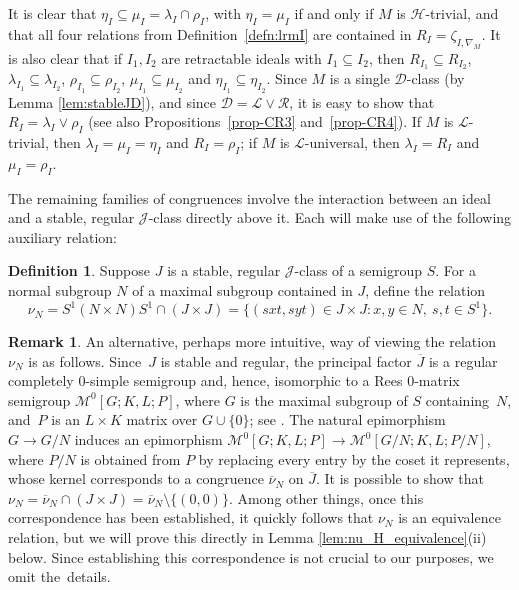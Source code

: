 \documentclass[11pt,a4paper]{article}
\newcommand{\M}{\mathcal M}
\renewcommand{\H}{\mathrel{\mathscr H}}
\renewcommand{\L}{\mathrel{\mathscr L}}
\newcommand{\R}{\mathrel{\mathscr R}}
\newcommand{\D}{\mathrel{\mathscr D}}
\newcommand{\gJ}{\mathrel{\mathscr J}}
\newcommand{\lam}{\lambda}
\newcommand{\set}[2]{\{ {#1} : {#2} \}}
\newcommand{\1}{\id_n}
\newcommand{\sub}{\subseteq}
\numberwithin{equation}{section}
\theoremstyle{definition}
\newtheorem{rem}[equation]{Remark}
\newtheorem{defn}[equation]{Definition}
\begin{document}
It is clear that $\eta_I\sub\mu_I=\lam_I\cap\rho_I$, with $\eta_I=\mu_I$ if and only if $M$ is $\H$-trivial, and that all four relations from Definition~\ref{defn:lrmI} are contained in $R_I=\zeta_{I,\nabla_M}$.  
%
It is also clear that if $I_1,I_2$ are retractable ideals with $I_1\sub I_2$, then $R_{I_1}\sub R_{I_2}$, $\lam_{I_1}\sub \lam_{I_2}$, $\rho_{I_1}\sub \rho_{I_2}$, $\mu_{I_1}\sub \mu_{I_2}$ and $\eta_{I_1}\sub \eta_{I_2}$.  Since $M$ is a single $\D$-class (by Lemma \ref{lem:stableJD}), and since ${\D}={\L}\vee{\R}$, it is easy to show that $R_I=\lam_I\vee\rho_I$ (see also Propositions~\ref{prop-CR3} and~\ref{prop-CR4}).  If $M$ is $\L$-trivial, then $\lam_I=\mu_I=\eta_I$ and $R_I=\rho_I$; if $M$ is $\L$-universal, then $\lam_I=R_I$ and~$\mu_I=\rho_I$.

The remaining families of congruences involve the interaction between an ideal and a stable, regular $\gJ$-class directly above it.  Each will make use of the following auxiliary relation:

\begin{defn}
\label{Rel-nu}
Suppose $J$ is a stable, regular $\gJ$-class of a semigroup $S$.  For a normal subgroup $N$ of a maximal subgroup contained in $J$, define the relation
\[
\nu_N = S^1(N\times N)S^1\cap(J\times J) = \set{ (sxt,syt)\in J\times J}{ x,y\in N,\ s,t\in S^1}.
\]
\end{defn}

\begin{rem}
An alternative, perhaps more intuitive, way of viewing the relation $\nu_N$ is
as follows.  
%
Since~$J$ is stable and regular, the principal factor $\overline{J}$ is a regular
completely $0$-simple semigroup and, hence, isomorphic to a Rees $0$-matrix
semigroup $\M^0[G;K,L; P]$, where $G$ is the maximal subgroup of $S$ containing~$N$, and~$P$ is an $L\times K$ matrix over $G\cup\{0\}$; see \cite[Section 3.2]{Howie}.  The natural
epimorphism $G\rightarrow G/N$ induces an epimorphism ${\M^0[G;K,L;P]\rightarrow
\M^0[G/N;K,L;P/N]}$, where $P/N$ is obtained from $P$ by replacing every entry by
the coset it represents, whose kernel corresponds to a congruence
$\overline{\nu}_N$ on $\overline{J}$.  It is possible to show that
$\nu_N=\overline{\nu}_N\cap(J\times J)=\overline{\nu}_N\setminus\{(0,0)\}$.  
%
Among other things, once this correspondence has been established, it quickly follows that $\nu_N$ is an equivalence relation, but we will prove this directly in Lemma \ref{lem:nu_H_equivalence}(ii) below.
%
Since establishing this correspondence is not crucial to our purposes, we omit the~details.
\end{rem}
\end{document}
